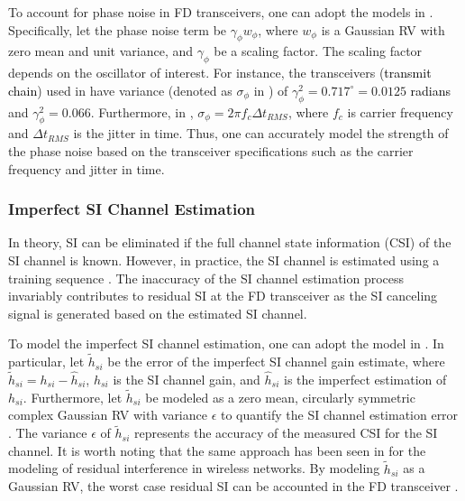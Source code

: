 To account for phase noise in FD transceivers, one can adopt the models in \cite{ernest2019outage,tan2018joint,ernest2019power,sahai2013impact}. Specifically, let the phase noise term be $\gamma_{\phi} w_{\phi}$, where $w_{\phi}$ is a Gaussian RV with zero mean and unit variance, and $\gamma_{\phi}$ be a scaling factor. The scaling factor depends on the oscillator of interest. For instance, the transceivers (\textcolor{black}{transmit chain}) used in \cite[Appendix C]{sahai2013impact} have variance (denoted as $\sigma_{\phi}$ in \cite{sahai2013impact}) of $\gamma_{\phi}^2 = 0.717^{\circ} = 0.0125$ \textcolor{black}{radians} and $\gamma_{\phi}^2 = 0.066$. Furthermore, in \cite[Appendix C]{sahai2013impact}, $\sigma_{\phi}=2\pi f_c \Delta{t_{RMS}}$, where $f_c$ is carrier frequency and $\Delta{t_{RMS}}$ is the jitter in time. Thus, one can accurately model the strength of the phase noise based on the transceiver specifications such as the carrier frequency and jitter in time.

\subsubsection{Imperfect SI Channel Estimation}
In theory, SI can be eliminated if the full channel state information (CSI) of the SI channel is known. However, in practice, the SI channel is estimated using a training sequence \cite{ahmed2015all,sahai2013impact}. The inaccuracy of the SI channel estimation process invariably contributes to residual SI at the FD transceiver as the SI canceling signal is generated based on the estimated SI channel.
 
To model the imperfect SI channel estimation, one can adopt the model in \cite{zlatanov2017capacity}. In particular, let $\widetilde{h}_{si}$ be the error of the imperfect SI channel gain estimate, where $\widetilde{h}_{si}=h_{si}-\widehat{h}_{si}$, $h_{si}$ is the SI channel gain, and $\widehat{h}_{si}$ is the imperfect estimation of $h_{si}$. Furthermore, let $\widetilde{h}_{si}$ be modeled as a zero mean, circularly symmetric complex Gaussian RV with variance $\epsilon$ to quantify the SI channel estimation error \cite{zlatanov2017capacity}. The variance $\epsilon$ of $\widetilde{h}_{si}$ represents the accuracy of the measured CSI for the SI channel. It is worth noting that the same approach has been seen in \cite{wang2017sir} for the modeling of residual interference in wireless networks. By modeling $\widetilde{h}_{si}$ as a Gaussian RV, the worst case residual SI can be accounted in the FD transceiver \cite{zlatanov2017capacity}.

